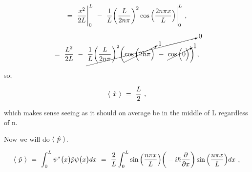 \documentclass{article}
\begin{document}
\begin{equation} \label{eq:246}
= \hspace{0.125cm} \frac{x^2}{2L} \Bigg|_{0}^{L} \hspace{0.125cm} - \hspace{0.125cm} \frac{1}{L} \bigg(\frac{L}{2n\pi}\bigg)^{2}  \cos\Big(\frac{2n\pi x}{L}\Big) \Bigg|_{0}^{L} \hspace{0.125cm} ,
\end{equation}

\begin{equation} \label{eq:247}
= \hspace{0.125cm} \frac{L^2}{2L} \hspace{0.125cm} - \hspace{0.125cm} \cancelto{0}{\frac{1}{L} \bigg(\frac{L}{2n\pi}\bigg)^{2} \bigg( \cancelto{1}{\cos\Big( 2n\pi \Big)} \hspace{0.125cm} - \hspace{0.125cm} \cancelto{1}{\cos\Big( 0 \Big)} \bigg)} \hspace{0.125cm} ,
\end{equation}

so;

\begin{equation} \label{eq:248}
\langle \hspace{0.125cm} \hat{x} \hspace{0.125cm} \rangle \hspace{0.125cm} = \hspace{0.125cm} \frac{L}{2} \hspace{0.125cm} , 
\end{equation}

which makes sense seeing as it should on average be in the middle of L regardless of n.

Now we will do \begin{math} \langle\hspace{0.125cm} \hat{p} \hspace{0.125cm} \rangle \end{math}.

\begin{equation} \label{eq:249}
\langle \hspace{0.125cm} \hat{p} \hspace{0.125cm} \rangle \hspace{0.125cm} = \hspace{0.125cm} \int_{0}^{L} \psi^{\ast}\big(x\big) \hat{p} \psi\big(x\big) dx \hspace{0.125cm} = \hspace{0.125cm} \frac{2}{L} \int_{0}^{L} \sin\Big(\frac{n\pi x}{L}\Big) \bigg( -i\hbar \frac{\partial}{\partial{x}} \bigg) \sin\Big(\frac{n\pi x}{L}\Big) dx \hspace{0.125cm} , 
\end{equation}
\end{document}
